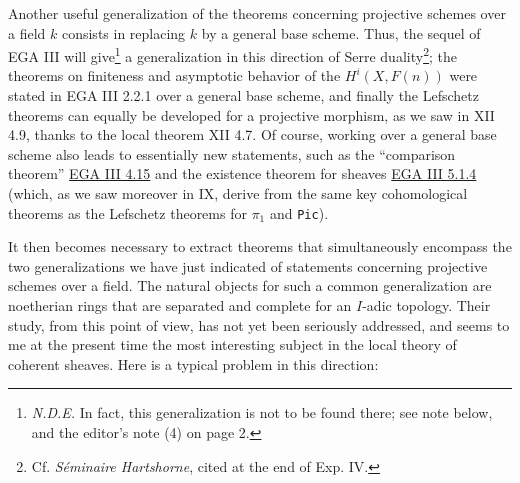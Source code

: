 \documentclass[
  11pt,
  a4paper,
]{book}
\begin{document}
Another useful generalization of the theorems concerning projective
schemes over a field \(k\) consists in replacing \(k\) by a general base
scheme. Thus, the sequel of EGA III will give\footnote{\emph{N.D.E.} In
  fact, this generalization is not to be found there; see note below,
  and the editor's note (4) on page 2.} a generalization in this
direction of Serre duality\footnote{Cf. \emph{Séminaire Hartshorne},
  cited at the end of Exp. IV.}; the theorems on finiteness and
asymptotic behavior of the \(H^{i}(X, F(n))\) were stated in EGA III
2.2.1 over a general base scheme, and finally the Lefschetz theorems can
equally be developed for a projective morphism, as we saw in XII 4.9,
thanks to the local theorem XII 4.7. Of course, working over a general
base scheme also leads to essentially new statements, such as the
``comparison theorem''
\href{https://jcreinhold.github.io/ega/iii/11-ch3-04-fundamental-theorem-proper-morphisms.html\#4-the-fundamental-theorem-of-proper-morphisms-applications}{EGA
III 4.15} and the existence theorem for sheaves
\href{https://jcreinhold.github.io/ega/iii/12-ch3-05-existence-coherent-algebraic-sheaves.html\#51-statement-of-the-theorem}{EGA
III 5.1.4} (which, as we saw moreover in IX, derive from the same key
cohomological theorems as the Lefschetz theorems for \(\pi_{1}\) and
\texttt{Pic}).

It then becomes necessary to extract theorems that simultaneously
encompass the two generalizations we have just indicated of statements
concerning projective schemes over a field. The natural objects for such
a common generalization are noetherian rings that are separated and
complete for an \(I\)-adic topology. Their study, from this point of
view, has not yet been seriously addressed, and seems to me at the
present time the most interesting subject in the local theory of
coherent sheaves. Here is a typical problem in this direction:
\end{document}

